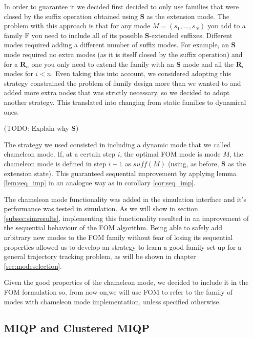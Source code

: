 \documentclass[12,twoside]{TFG-GM}
\theoremstyle{definition}
\theoremstyle{remark}
\begin{document}
In order to guarantee it we decided first decided to only use families that were closed by the suffix operation obtained using $\textbf{S}$ as the extension mode. The problem with this approach is that for any mode $M = (s_1, ..., s_N)$ you add to a family F you need to include all of its possible $\textbf{S}$-extended suffixes. Different modes required adding a different number of suffix modes. For example, an $\textbf{S}$ mode required no extra modes (as it is itself closed by the suffix operation) and for a $\textbf{R}_n$ one you only need to extend the family with an $\textbf{S}$ mode and all the $\textbf{R}_i$ modes for $i < n$. Even taking this into account, we considered adopting this strategy constrained the problem of family design more than we wanted to and added more extra nodes that was strictly necessary, so we decided to adopt another strategy. This translated into changing from static families to dynamical ones.

(TODO: Explain why $\textbf{S}$)

The strategy we used consisted in including a dynamic mode that we called chameleon mode. If, at a certain step $i$, the optimal FOM mode is mode $M$, the chameleon mode is defined in step $i + 1$ as $suff(M)$ (using, as before, $\textbf{S}$ as the extension state). This guaranteed sequential improvement by applying lemma \ref{lem:seq_imp} in an analogue way as in corollary \ref{cor:seq_imp}.

The chameleon mode functionality was added in the simulation interface and it's performance was tested in simulation. As we will show in section \ref{subsec:simresults}, implementing this functionality resulted in an improvement of the sequential behaviour of the FOM algorithm. Being able to safely add arbitrary new modes to the FOM family without fear of losing its sequential properties allowed us to develop an strategy to learn a good family set-up for a general trajectory tracking problem, as will be shown in chapter \ref{sec:modeselection}.

Given the good properties of the chameleon mode, we decided to include it in the FOM formulation so, from now on,we will use FOM to refer to the family of modes with chameleon mode implementation, unless specified otherwise.

\subsection{MIQP and Clustered MIQP}
\label{subsec:miqp}
\end{document}
